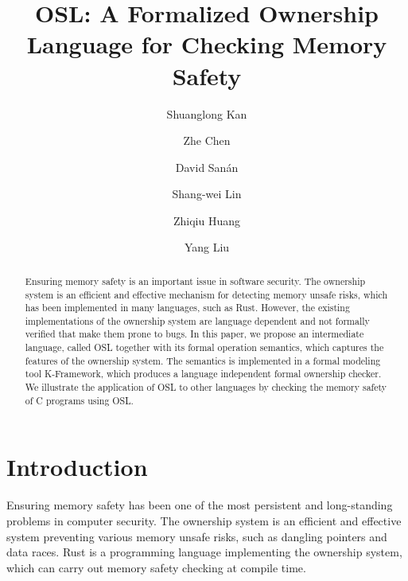\documentclass[runningheads]{llncs}
\begin{document}
\title{\textbf{OSL}: A Formalized Ownership Language for Checking Memory Safety}
\author{Shuanglong Kan \and
	Zhe Chen  \and
	David San{\'a}n \and
	Shang-wei Lin \and Zhiqiu Huang \and Yang Liu }
%
%


\maketitle

\begin{abstract}
	Ensuring memory safety is an important issue in software security. 
	The ownership system is an efficient and effective mechanism for detecting memory unsafe risks, which has been implemented in many languages, such as Rust.
	However, the existing implementations of the ownership system are language dependent and not formally verified that make them prone to bugs. 
	In this paper,  we propose an intermediate language, called OSL together with its formal operation semantics, which captures
	the features of the ownership system.
	The semantics is implemented in a formal modeling tool K-Framework, which produces a language independent formal ownership checker.
	We illustrate the application of OSL to other  languages by  checking the memory safety of C programs using OSL.
	
\end{abstract}

\section{Introduction}



Ensuring memory safety has been one of the most persistent and long-standing problems in computer security.
The ownership system \cite{DBLP:conf/oopsla/BoyapatiLR02}\cite{DBLP:conf/popl/BoyapatiLS03} is an efficient and effective system preventing various memory unsafe risks, such as dangling pointers and data races.
Rust \cite{rusthome} is a programming language implementing the ownership system, which can carry out memory safety checking at compile time.
 
\end{document}
